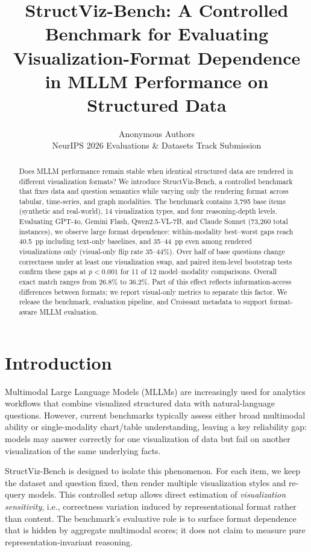 \documentclass{article}
\title{StructViz-Bench: A Controlled Benchmark for Evaluating Visualization-Format Dependence in MLLM Performance on Structured Data}
\author{%
  Anonymous Authors \\
  NeurIPS 2026 Evaluations \& Datasets Track Submission \\
}
\begin{document}
\maketitle

\begin{abstract}
Does MLLM performance remain stable when identical structured data are rendered in different visualization formats? We introduce StructViz-Bench, a controlled benchmark that fixes data and question semantics while varying only the rendering format across tabular, time-series, and graph modalities. The benchmark contains 3,795 base items (synthetic and real-world), 14 visualization types, and four reasoning-depth levels. Evaluating GPT-4o, Gemini Flash, Qwen2.5-VL-7B, and Claude Sonnet (73,260 total instances), we observe large format dependence: within-modality best--worst gaps reach 40.5~pp including text-only baselines, and 35--44~pp even among rendered visualizations only (visual-only flip rate 35--44\%). Over half of base questions change correctness under at least one visualization swap, and paired item-level bootstrap tests confirm these gaps at $p < 0.001$ for 11 of 12 model--modality comparisons. Overall exact match ranges from 26.8\% to 36.2\%. Part of this effect reflects information-access differences between formats; we report visual-only metrics to separate this factor. We release the benchmark, evaluation pipeline, and Croissant metadata to support format-aware MLLM evaluation.
\end{abstract}

\section{Introduction}
Multimodal Large Language Models (MLLMs) are increasingly used for analytics workflows that combine visualized structured data with natural-language questions. However, current benchmarks typically assess either broad multimodal ability or single-modality chart/table understanding, leaving a key reliability gap: models may answer correctly for one visualization of data but fail on another visualization of the same underlying facts.

StructViz-Bench is designed to isolate this phenomenon. For each item, we keep the dataset and question fixed, then render multiple visualization styles and re-query models. This controlled setup allows direct estimation of \emph{visualization sensitivity}, i.e., correctness variation induced by representational format rather than content. The benchmark's evaluative role is to surface format dependence that is hidden by aggregate multimodal scores; it does not claim to measure pure representation-invariant reasoning.
\end{document}
